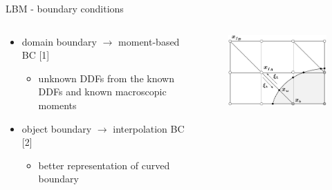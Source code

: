 \documentclass[aspectratio=169,xcolor=dvipsnames]{beamer}
\begin{document}
\begin{frame}{LBM - boundary conditions}
	\begin{columns}[T] %
		\begin{column}{.55\textwidth}
			\begin{itemize}
				\item domain boundary $ \rightarrow $ moment-based BC [1]
				\begin{itemize}
					\vspace{-3mm}
					\item unknown DDFs from the known DDFs and known macroscopic moments
					\vspace{1mm}
				\end{itemize}
				\item object boundary $ \rightarrow $ interpolation BC [2]
				\begin{itemize}
					\vspace{1mm}
					\item better representation of curved boundary
					\vspace{1mm}
				\end{itemize}
			\end{itemize}
		\end{column}%
		\begin{column}{.45\textwidth}
			\begin{figure}
				\vspace{-0.5cm}
				\includegraphics[width=0.78\linewidth, trim={0 0 0 0}, clip]{Images/bouzidi.pdf}
			\end{figure}
		\end{column}%
	\end{columns}
	\vspace{4.5mm}
	\begin{columns}
		\begin{column}{.63\textwidth}

\end{column}
\end{columns}
\end{frame}
\end{document}
